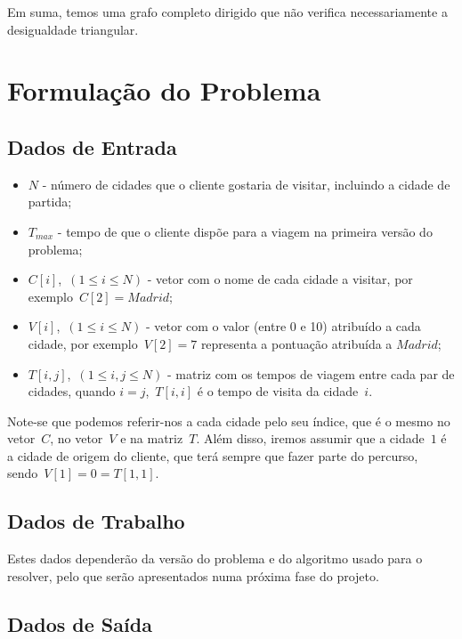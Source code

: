 \documentclass[12pt,a4paper,reqno]{report}
\numberwithin{figure}{section}
\numberwithin{equation}{section}
\numberwithin{figure}{section}
\numberwithin{equation}{section}
\begin{document}
Em suma, temos uma grafo completo dirigido que não verifica necessariamente a desigualdade triangular.

\chapter{Formulação do Problema}

\section{Dados de Entrada}

\begin{itemize}
	\item $N$ - número de cidades que o cliente gostaria de visitar, incluindo a cidade de partida;
	\item $T_{max}$ - tempo de que o cliente dispõe para a viagem na primeira versão do problema;
	\item $C[i]$,~$(1 \leq i \leq N)$ - vetor com o nome de cada cidade a visitar, por exemplo~$C[2] = Madrid$;
	\item $V[i]$,~$(1 \leq i \leq N)$ - vetor com o valor (entre 0 e 10) atribuído a cada cidade, por exemplo~$V[2] = 7$ representa a pontuação atribuída a $Madrid$;
	\item $T[i,j]$,~$(1 \leq i,j \leq N)$ - matriz com os tempos de viagem entre cada par de cidades, quando $i = j$,~$T[i,i]$ é o tempo de visita da cidade~$i$.
\end{itemize}

Note-se que podemos referir-nos a cada cidade pelo seu índice, que é o mesmo no vetor~$C$, no vetor~$V$ e na matriz~$T$. Além disso, iremos assumir que a cidade~$1$ é a cidade de origem do cliente, que terá sempre que fazer parte do percurso, sendo~$V[1] = 0 = T[1,1]$.

\section{Dados de Trabalho}

Estes dados dependerão da versão do problema e do algoritmo usado para o resolver, pelo que serão apresentados numa próxima fase do projeto.

\section{Dados de Saída}
\end{document}
